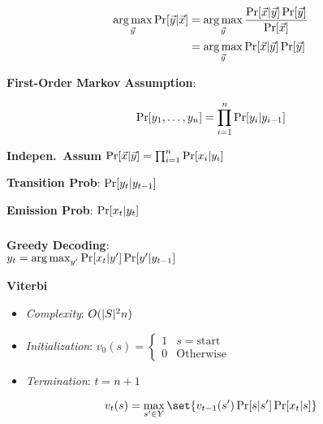\documentclass[9pt]{extarticle}
\renewcommand{\green}[1]{{\color{ForestGreen} #1}}
\newcommand{\greenbf}[1]{\textbf{\green{#1}}}
\begin{document}
\begin{multicols}{3}
  \begin{align*}
    \operatorname*{arg\,max}_{\vec{y}} \Pr\lbrack\vec{y} \vert \vec{x}\rbrack &= \operatorname*{arg\,max}_{\vec{y}} \frac{\Pr\lbrack\vec{x} \vert \vec{y}\rbrack\Pr[\vec{y}]}{\Pr[\vec{x}]} \\
                                                        &= \operatorname*{arg\,max}_{\vec{y}} \Pr\lbrack\vec{x} \vert \vec{y}\rbrack \Pr[\vec{y}]
  \end{align*}

  \greenbf{First-Order Markov Assumption}:

  \begin{equation*}
    \Pr\lbrack y_{1},\ldots,y_{n}\rbrack = \prod_{i=1}^{n} \Pr[y_{i} \vert y_{i-1}]
  \end{equation*}

  \greenbf{Indepen.\ Assum} $\Pr\lbrack\vec{x} \vert \vec{y}\rbrack = \prod_{i=1}^{n} \Pr[x_{i} \vert y_{i}]$

  \greenbf{Transition Prob}: $\Pr\lbrack y_{t} \vert y_{t-1}\rbrack$

  \greenbf{Emission Prob}: $\Pr\lbrack x_{t} \vert y_{t}\rbrack$

  \subsubsection*{}

  \greenbf{Greedy Decoding}: \\${y_t = \operatorname*{arg\,max}_{y'} \Pr[x_t \vert y'] \Pr[y' \vert y_{t-1}]}$

  \greenbf{Viterbi}
  \begin{itemize}
    \item \textit{Complexity}: $O(\lvert S\rvert^{2} n)$
    \item \textit{Initialization}: $v_0(s) = \begin{cases}
                                               1 & s = \text{start} \\
                                               0 & \text{Otherwise}
                                             \end{cases}$
    \item \textit{Termination}: $t = n+1$
  \end{itemize}

  \begin{equation*}
    v_{t}(s) = \max_{s' \in Y}\set{v_{t-1}(s') \Pr[s \vert s'] \Pr[x_t \vert s]}
  \end{equation*}

  \subsection*{}

\end{multicols}
\end{document}
